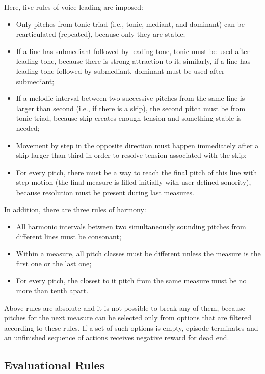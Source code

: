 \documentclass{article}
\begin{document}
Here, five rules of voice leading are imposed:
\begin{itemize}
	\item Only pitches from tonic triad (i.e., tonic, mediant, and dominant) can be rearticulated (repeated), because only they are stable;
	\item If a line has submediant followed by leading tone, tonic must be used after leading tone, because there is strong attraction to it; similarly, if a line has leading tone followed by submediant, dominant must be used after submediant;
	\item If a melodic interval between two successive pitches from the same line is larger than second (i.e., if there is a skip), the second pitch must be from tonic triad, because skip creates enough tension and something stable is needed;
	\item Movement by step in the opposite direction must happen immediately after a skip larger than third in order to resolve tension associated with the skip;
	\item For every pitch, there must be a way to reach the final pitch of this line with step motion (the final measure is filled initially with user-defined sonority), because resolution must be present during last measures.
\end{itemize}
In addition, there are three rules of harmony:
\begin{itemize}
	\item All harmonic intervals between two simultaneously sounding pitches from different lines must be consonant;
	\item Within a measure, all pitch classes must be different unless the measure is the first one or the last one;
	\item For every pitch, the closest to it pitch from the same measure must be no more than tenth apart.
\end{itemize}

Above rules are absolute and it is not possible to break any of them, because pitches for the next measure can be selected only from options that are filtered according to these rules. If a set of such options is empty, episode terminates and an unfinished sequence of actions receives negative reward for dead end.


\subsection{Evaluational Rules}
\label{subsec:setup}
\end{document}
